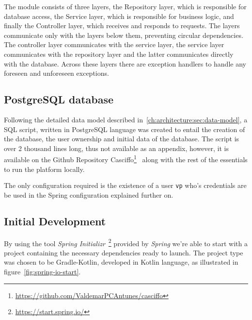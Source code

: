 The module consists of three layers, the Repository layer, which is responsible for database access, the Service layer, which is responsible for business logic, and finally the Controller layer, which receives and responds to requests. The layers communicate only with the layers below them, preventing circular dependencies. The controller layer communicates with the service layer, the service layer communicates with the repository layer and the latter communicates directly with the database. Across these layers there are exception handlers to handle any foreseen and unforeseen exceptions.


\subsection{PostgreSQL database}\label{ch:impl:sec:be:subsec:config-postgresql}

Following the detailed data model described in~\ref{ch:architecture:sec:data-model}, a SQL script, written in PostgreSQL language was created to entail the creation of the database, the user ownership and initial data of the database. The script is over 2 thousand lines long, thus not available as an appendix, however, it is available on the Github Repository Casciffo\footnote{\url{https://github.com/ValdemarPCAntunes/casciffo}}~\label{fn:gh-casciffo-impl} along with the rest of the essentials to run the platform locally.

The only configuration required is the existence of a user \lstinline{vp} who's credentials are be used in the Spring configuration explained further on.  


\subsection{Initial Development}\label{ch:impl:sec:be:subsec:be-init-dev}

By using the tool \textit{Spring Initializr}~\footnote{\url{https://start.spring.io/}}\label{fn:spring-io} provided by \textit{Spring} we're able to start with a project containing the necessary dependencies ready to launch. The project type was chosen to be Gradle-Kotlin, developed in Kotlin language, as illustrated in figure~\ref{fig:spring-io-start}.

